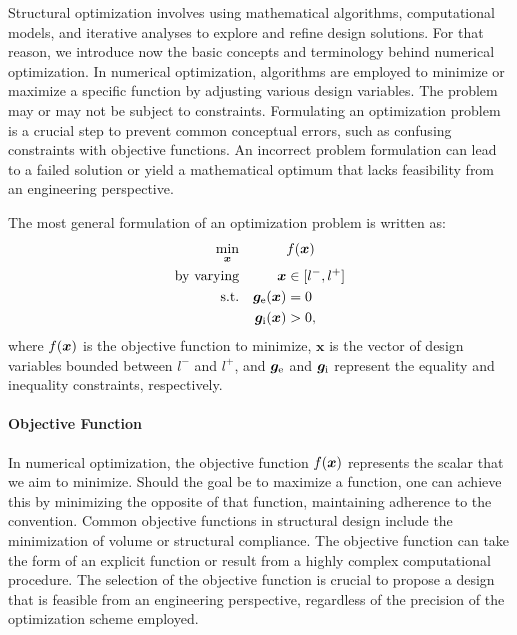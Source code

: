 Structural optimization involves using mathematical algorithms, computational models, and iterative analyses to explore and refine design solutions. For that reason, we introduce now the basic concepts and terminology behind numerical optimization. In numerical optimization, algorithms are employed to minimize or maximize a specific function by adjusting various design variables. The problem may or may not be subject to constraints. Formulating an optimization problem is a crucial step to prevent common conceptual errors, such as confusing constraints with objective functions. An incorrect problem formulation can lead to a failed solution or yield a mathematical optimum that lacks feasibility from an engineering perspective.

The most general formulation of an optimization problem is written as:
\begin{equation}
    \begin{aligned}
    \min_{\bm{x}}         && & f(\bm{x})\\
    \textrm{by varying}   && \bm{x} &\in [l^-,l^+] \\
    \textrm{s.t.}   && \bm{g}_\text{e}(\bm{x}) &= 0 \\
    && \bm{g}_\text{i}(\bm{x}) &> 0, \\
    \end{aligned}
\end{equation}
where $ f(\bm{x}) $ is the objective function to minimize, $ \bm{x} $ is the vector of design variables bounded between $ l^- $ and $ l^+ $, and $\bm{g}_\text{e}$ and $\bm{g}_\text{i}$ represent the equality and inequality constraints, respectively.

\paragraph{Objective Function}
In numerical optimization, the objective function $f(\bm{x})$ represents the scalar that we aim to minimize. Should the goal be to maximize a function, one can achieve this by minimizing the opposite of that function, maintaining adherence to the convention. Common objective functions in structural design include the minimization of volume or structural compliance. The objective function can take the form of an explicit function or result from a highly complex computational procedure. The selection of the objective function is crucial to propose a design that is feasible from an engineering perspective, regardless of the precision of the optimization scheme employed.

